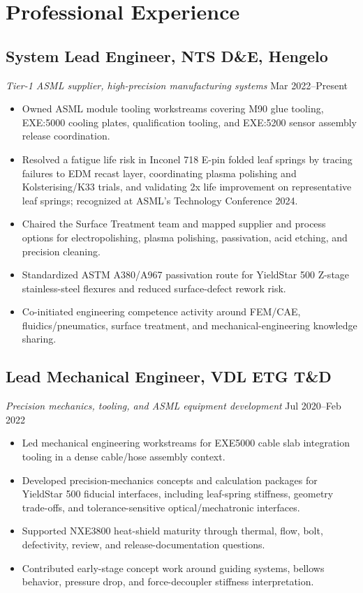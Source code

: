 \documentclass[11pt,a4paper]{article}
\begin{document}
\section{Professional Experience}

\subsection{System Lead Engineer, NTS D\&E, Hengelo}
{\small\textit{Tier-1 ASML supplier, high-precision manufacturing systems}} \hfill {\small Mar 2022--Present}
\begin{itemize}
 \item Owned ASML module tooling workstreams covering M90 glue tooling, EXE:5000 cooling plates, qualification tooling, and EXE:5200 sensor assembly release coordination.
 \item Resolved a fatigue life risk in Inconel 718 E-pin folded leaf springs by tracing failures to EDM recast layer, coordinating plasma polishing and Kolsterising/K33 trials, and validating 2x life improvement on representative leaf springs; recognized at ASML's Technology Conference 2024.
 \item Chaired the Surface Treatment team and mapped supplier and process options for electropolishing, plasma polishing, passivation, acid etching, and precision cleaning.
 \item Standardized ASTM A380/A967 passivation route for YieldStar 500 Z-stage stainless-steel flexures and reduced surface-defect rework risk.
 \item Co-initiated engineering competence activity around FEM/CAE, fluidics/pneumatics, surface treatment, and mechanical-engineering knowledge sharing.
\end{itemize}

\subsection{Lead Mechanical Engineer, VDL ETG T\&D}
{\small\textit{Precision mechanics, tooling, and ASML equipment development}} \hfill {\small Jul 2020--Feb 2022}
\begin{itemize}
 \item Led mechanical engineering workstreams for EXE5000 cable slab integration tooling in a dense cable/hose assembly context.
 \item Developed precision-mechanics concepts and calculation packages for YieldStar 500 fiducial interfaces, including leaf-spring stiffness, geometry trade-offs, and tolerance-sensitive optical/mechatronic interfaces.
 \item Supported NXE3800 heat-shield maturity through thermal, flow, bolt, defectivity, review, and release-documentation questions.
 \item Contributed early-stage concept work around guiding systems, bellows behavior, pressure drop, and force-decoupler stiffness interpretation.
\end{itemize}
\end{document}
